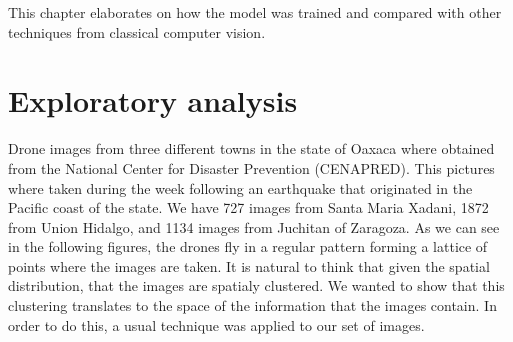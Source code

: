This chapter elaborates on how the model was trained and compared with other techniques from classical computer vision. 

\section{Exploratory analysis}

Drone images from three different towns in the state of Oaxaca where obtained from the National Center for Disaster Prevention (CENAPRED). This pictures where taken during the week following an earthquake that originated in the Pacific coast of the state. We have 727 images from Santa Maria Xadani, 1872 from Union Hidalgo, and 1134 images from Juchitan of Zaragoza. As we can see in the following figures, the drones fly in a regular pattern forming a lattice of points where the images are taken. It is natural to think that given the spatial distribution, that the images are spatialy clustered. We wanted to show that this clustering translates to the space of the information that the images contain. In order to do this, a usual technique was applied to our set of images.

\begin{figure}[h]
  \begin{center}
  \end{center}
\end{figure}

